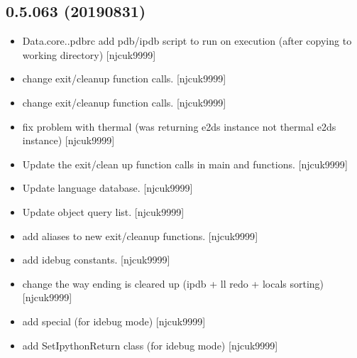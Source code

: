 \documentclass[a4paper,10pt,english]{report}
\begin{document}
\subsection{0.5.063 (2019\sphinxhyphen{}08\sphinxhyphen{}31)}
\label{\detokenize{misc/changelog:id98}}\begin{itemize}
\item {} 
Data.core..pdbrc \sphinxhyphen{} add pdb/ipdb script to run on execution (after
copying to working directory) {[}njcuk9999{]}

\item {} 
 \sphinxhyphen{} change exit/cleanup function
calls. {[}njcuk9999{]}

\item {} 
 \sphinxhyphen{} change exit/cleanup function calls.
{[}njcuk9999{]}

\item {} 
 \sphinxhyphen{} fix problem with thermal (was returning
e2ds instance not thermal e2ds instance) {[}njcuk9999{]}

\item {} 
Update the exit/clean up function calls in main and 
functions. {[}njcuk9999{]}

\item {} 
Update language database. {[}njcuk9999{]}

\item {} 
Update object query list. {[}njcuk9999{]}

\item {} 
 \sphinxhyphen{} add aliases to new exit/cleanup functions.
{[}njcuk9999{]}

\item {} 
 \sphinxhyphen{} add idebug constants.
{[}njcuk9999{]}

\item {} 
 \sphinxhyphen{} change the way ending is cleared up (ipdb +
ll redo + locals sorting) {[}njcuk9999{]}

\item {} 
 \sphinxhyphen{} add special  (for idebug
mode) {[}njcuk9999{]}

\item {} 
 \sphinxhyphen{} add SetIpythonReturn class (for idebug
mode) {[}njcuk9999{]}


\end{itemize}
\end{document}
